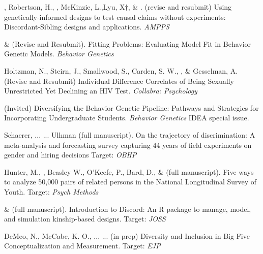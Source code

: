 

\item \meb, Robertson, H.\noteA, \jt, McKinzie, L.,\noteA Lyu, X$\dagger$, \& \joe. (revise and resubmit) Using genetically-informed designs to test causal claims without experiments: Discordant-Sibling designs and applications. \href{https://osf.io/zpdwt/}{\small\color{blue}{osf.io/zpdwt/}} \textit{AMPPS} %
%
\item \meb \& \joe (Revise and Resubmit). Fitting Problems: Evaluating Model Fit in Behavior Genetic Models. \textit{Behavior Genetics}
\item Holtzman, N., Steirn, J., Smallwood, S., Carden, S. W., \meb, \& Gesselman, A. (Revise and Resubmit) Individual Difference Correlates of Being Sexually Unrestricted Yet Declining an HIV Test. \textit{Collabra: Psychology}%
\item \meb (Invited) Diversifying the Behavior Genetic Pipeline: Pathways and Strategies for Incorporating Undergraduate Students. \textit{Behavior Genetics} IDEA special issue.


\item Schaerer, ... \meb ... Ulhman (full manuscript). On the trajectory of discrimination: A meta-analysis and forecasting survey capturing 44 years of field experiments on gender and hiring decisions  Target: \textit{OBHP}

\item Hunter, M., \meb, Beasley W., O'Keefe, P.,  Bard, D., \& \Joe (full manuscript). Five ways to analyze 50,000 pairs of related persons in the National Longitudinal Survey of Youth.  Target: \textit{Psych Methods}

\item \jt \& \meb (full manuscript). Introduction to Discord: An R package to manage, model, and simulation kinship-based designs. Target: \textit{JOSS}

\item DeMeo, N., McCabe, K. O., ... \meb ... (in prep) Diversity and Inclusion in Big Five Conceptualization and Measurement.  Target: \textit{EJP}

